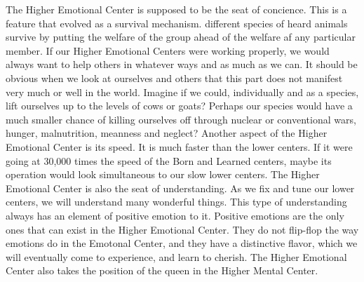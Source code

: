 \documentclass[12pt,letterpaper]{book}
\begin{document}
The Higher Emotional Center is supposed to be the seat of concience. This is a feature that evolved as a survival mechanism. different species of heard animals survive by putting the welfare of the group ahead of the welfare af any particular member. If  our Higher Emotional Centers were working properly, we would always want to help others in whatever ways and as much as we can. It should be obvious when we look at ourselves and others that this part does not manifest very much or well in the world. Imagine if we could, individually and as a species, lift ourselves up to the levels of cows or goats? Perhaps our species would have a much smaller chance of killing ourselves off through nuclear or conventional wars, hunger, malnutrition, meanness and neglect? Another aspect of the Higher Emotional Center is its speed. It is much faster than the lower centers. If it were going at 30,000 times the speed of the Born and Learned centers, maybe its operation would look simultaneous to our slow lower centers. The Higher Emotional Center is also the seat of understanding. As we fix and tune our lower centers, we will understand many wonderful things. This type of understanding always has an element of positive emotion to it. Positive emotions are the only ones that can exist in the Higher Emotional Center. They do not flip-flop the way emotions do in the Emotonal Center, and they have a distinctive flavor, which we will eventually come to experience, and learn to cherish. The Higher Emotional Center also takes the position of the queen in the Higher Mental Center.
\end{document}
